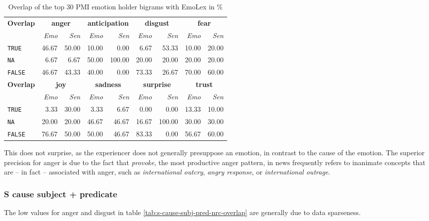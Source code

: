 \begin{table}[]
\centering
\begin{tabular}{l|rr|rr|rr|rr}
{\bf Overlap} & \multicolumn{2}{c}{{\bf anger}} & \multicolumn{2}{c}{{\bf anticipation}} & \multicolumn{2}{c}{{\bf disgust}} & \multicolumn{2}{c}{{\bf fear}} \\
 & {\it Emo} & {\it Sen} & {\it Emo} & {\it Sen} & {\it Emo} & {\it Sen} & {\it Emo} & {\it Sen} \\\hline
\texttt{TRUE} & 46.67 & 50.00 & 10.00 & 0.00 & 6.67 & 53.33 & 10.00 & 20.00 \\
\texttt{NA} & 6.67 & 6.67 & 50.00 & 100.00 & 20.00 & 20.00 & 20.00 & 20.00 \\
\texttt{FALSE} & 46.67 & 43.33 & 40.00 & 0.00 & 73.33 & 26.67 & 70.00 & 60.00 \\
{\bf Overlap} & \multicolumn{2}{c}{{\bf joy}} & \multicolumn{2}{c}{{\bf sadness}} & \multicolumn{2}{c}{{\bf surprise}} & \multicolumn{2}{c}{{\bf trust}} \\
 & {\it Emo} & {\it Sen} & {\it Emo} & {\it Sen} & {\it Emo} & {\it Sen} & {\it Emo} & {\it Sen} \\\hline
\texttt{TRUE} & 3.33 & 30.00 & 3.33 & 6.67 & 0.00 & 0.00 & 13.33 & 10.00 \\
\texttt{NA} & 20.00 & 20.00 & 46.67 & 46.67 & 16.67 & 100.00 & 30.00 & 30.00 \\
\texttt{FALSE} & 76.67 & 50.00 & 50.00 & 46.67 & 83.33 & 0.00 & 56.67 & 60.00
\end{tabular}
\caption{Overlap of the top 30 PMI emotion holder bigrams with EmoLex in \%}
\label{tab:emotion-holder-nrc-overlap}
\end{table}

This does not surprise, as the experiencer does not generally presuppose an emotion, in contrast to the cause of the emotion. The superior precision for anger is due to the fact that \textit{provoke}, the most productive anger pattern, in news frequently refers to inanimate concepts that are -- in fact -- associated with anger, such as \textit{international outcry}, \textit{angry response}, or \textit{international outrage}. 

\subsubsection{S cause subject + predicate}

The low values for anger and disgust in table \ref{tab:s-cause-subj-pred-nrc-overlap} are generally due to data sparseness.

